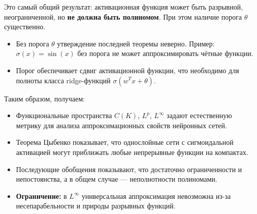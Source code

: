 \documentclass[../NDCNNAI_main.tex]{subfiles}
\begin{document}
\begin{remark}
    Это самый общий результат: активационная функция может быть разрывной, неограниченной, но \textbf{не должна быть полиномом}. При этом наличие порога \( \theta \) существенно.
\end{remark}
\begin{itemize}
    \item Без порога \( \theta \) утверждение последней теоремы неверно. Пример: \( \sigma(x) = \sin(x) \) без порога не может аппроксимировать чётные функции.
    \item Порог обеспечивает сдвиг активационной функции, что необходимо для полноты класса ridge-функций \( \sigma(w^T x + \theta) \).
\end{itemize}
Таким образом, получаем:
\begin{itemize}
    \item Функциональные пространства \( C(K) \), \( L^p \), \( L^\infty \) задают естественную метрику для анализа аппроксимационных свойств нейронных сетей.
    \item Теорема Цыбенко показывает, что однослойные сети с сигмоидальной активацией могут приближать любые непрерывные функции на компактах.
    \item Последующие обобщения показывают, что достаточно ограниченности и непостоянства, а в общем случае --- неполнотности полиномами.
    \item \textbf{Ограничение:} в \( L^\infty \) универсальная аппроксимация невозможна из-за несепарабельности и природы разрывных функций.
\end{itemize}
\end{document}
